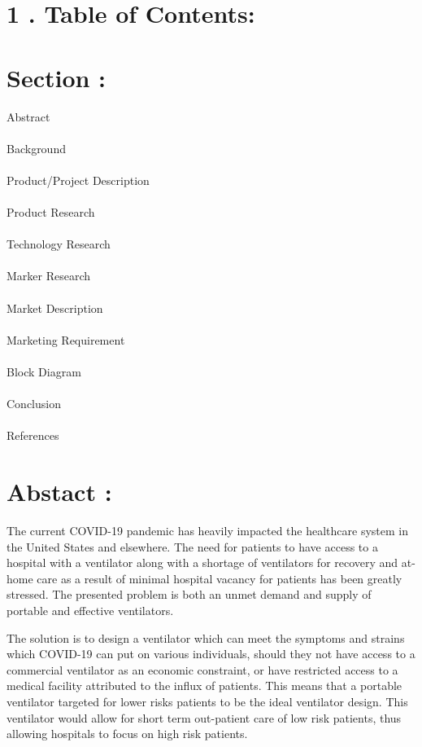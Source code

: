 \documentclass[12pt]{article}
\begin{document}
\section*{1 . Table of Contents:} 


\section*{Section :}
Abstract\\\\Background\\\\Product/Project Description\\\\Product Research\\\\Technology Research\\\\Marker Research\\\\Market Description\\\\Marketing Requirement\\\\Block Diagram\\\\Conclusion\\\\References

\clearpage
\section*{Abstact : }
The current COVID-19 pandemic has heavily impacted the healthcare system in the
United States and elsewhere. The need for patients to have access to a hospital with a ventilator
along with a shortage of ventilators for recovery and at-home care as a result of minimal hospital
vacancy for patients has been greatly stressed. The presented problem is both an unmet demand
and supply of portable and effective ventilators.


The solution is to design a ventilator which can meet the symptoms and strains which
COVID-19 can put on various individuals, should they not have access to a commercial
ventilator as an economic constraint, or have restricted access to a medical facility attributed to
the influx of patients. This means that a portable ventilator targeted for lower risks patients to be
the ideal ventilator design. This ventilator would allow for short term out-patient care of low risk
patients, thus allowing hospitals to focus on high risk patients.
\end{document}
